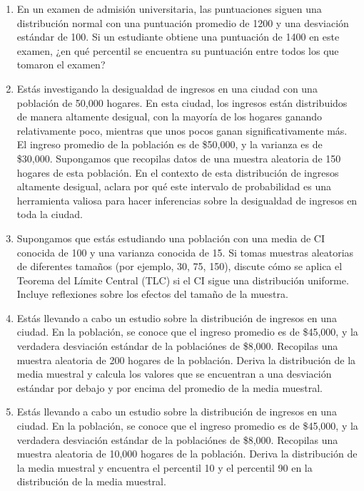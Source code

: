 \documentclass[
  letterpaper,
  DIV=11,
  numbers=noendperiod]{scrartcl}
\begin{document}
\begin{enumerate}
  de crédito en el 20\% superior, ¿cuál es la puntuación mínima de
  crédito requerida para la aprobación de un préstamo?
\item
  En un examen de admisión universitaria, las puntuaciones siguen una
  distribución normal con una puntuación promedio de 1200 y una
  desviación estándar de 100. Si un estudiante obtiene una puntuación de
  1400 en este examen, ¿en qué percentil se encuentra su puntuación
  entre todos los que tomaron el examen?
\item
  Estás investigando la desigualdad de ingresos en una ciudad con una
  población de 50,000 hogares. En esta ciudad, los ingresos están
  distribuidos de manera altamente desigual, con la mayoría de los
  hogares ganando relativamente poco, mientras que unos pocos ganan
  significativamente más. El ingreso promedio de la población es de
  \$50,000, y la varianza es de \$30,000. Supongamos que recopilas datos
  de una muestra aleatoria de 150 hogares de esta población. En el
  contexto de esta distribución de ingresos altamente desigual, aclara
  por qué este intervalo de probabilidad es una herramienta valiosa para
  hacer inferencias sobre la desigualdad de ingresos en toda la ciudad.
\item
  Supongamos que estás estudiando una población con una media de CI
  conocida de 100 y una varianza conocida de 15. Si tomas muestras
  aleatorias de diferentes tamaños (por ejemplo, 30, 75, 150), discute
  cómo se aplica el Teorema del Límite Central (TLC) si el CI sigue una
  distribución uniforme. Incluye reflexiones sobre los efectos del
  tamaño de la muestra.
\item
  Estás llevando a cabo un estudio sobre la distribución de ingresos en
  una ciudad. En la población, se conoce que el ingreso promedio es de
  \$45,000, y la verdadera desviación estándar de la poblaciónes de
  \$8,000. Recopilas una muestra aleatoria de 200 hogares de la
  población. Deriva la distribución de la media muestral y calcula los
  valores que se encuentran a una desviación estándar por debajo y por
  encima del promedio de la media muestral.
\item
  Estás llevando a cabo un estudio sobre la distribución de ingresos en
  una ciudad. En la población, se conoce que el ingreso promedio es de
  \$45,000, y la verdadera desviación estándar de la poblaciónes de
  \$8,000. Recopilas una muestra aleatoria de 10,000 hogares de la
  población. Deriva la distribución de la media muestral y encuentra el
  percentil 10 y el percentil 90 en la distribución de la media
  muestral.
\end{enumerate}
\end{document}
